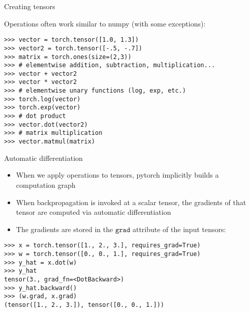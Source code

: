 \begin{vbframe}{Creating tensors}

Operations often work similar to numpy (with some exceptions):
\vfill
\begin{verbatim}
>>> vector = torch.tensor([1.0, 1.3])
>>> vector2 = torch.tensor([-.5, -.7])
>>> matrix = torch.ones(size=(2,3))
>>> # elementwise addition, subtraction, multiplication...
>>> vector + vector2
>>> vector * vector2
>>> # elementwise unary functions (log, exp, etc.)
>>> torch.log(vector)
>>> torch.exp(vector)
>>> # dot product
>>> vector.dot(vector2)
>>> # matrix multiplication
>>> vector.matmul(matrix)
\end{verbatim}

		   
\vfill

\end{vbframe}

\begin{vbframe}{Automatic differentiation}

\begin{itemize}
	\item When we apply operations to tensors, pytorch implicitly builds a computation graph
	\item When backpropagation is invoked at a scalar tensor, the gradients of that tensor are computed via automatic differentiation
	\item The gradients are stored in the $\texttt{grad}$ attribute of the input tensors:
\end{itemize}
\begin{verbatim}
>>> x = torch.tensor([1., 2., 3.], requires_grad=True)
>>> w = torch.tensor([0., 0., 1.], requires_grad=True)
>>> y_hat = x.dot(w)
>>> y_hat
tensor(3., grad_fn=<DotBackward>)
>>> y_hat.backward()
>>> (w.grad, x.grad)
(tensor([1., 2., 3.]), tensor([0., 0., 1.]))
\end{verbatim}
	
			
\vfill

\end{vbframe}

